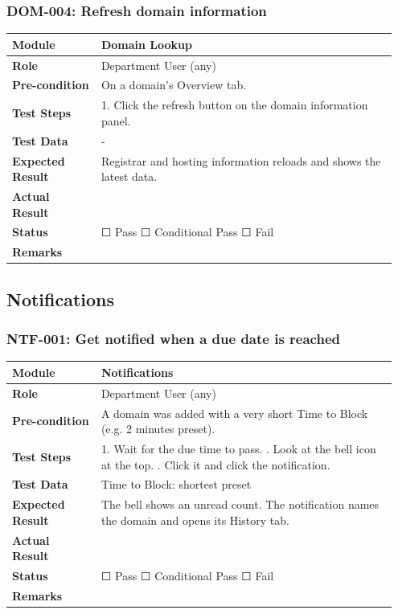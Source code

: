 \documentclass[10pt]{article}
\begin{document}
\subsubsection*{DOM-004: Refresh domain information}
\begin{longtable}{p{0.22\linewidth}p{0.73\linewidth}}
\hline
\textbf{Module} & Domain Lookup \\ \hline
\textbf{Role} & Department User (any) \\ \hline
\textbf{Pre-condition} & On a domain's Overview tab. \\ \hline
\textbf{Test Steps} & 1. Click the refresh button on the domain information panel. \\ \hline
\textbf{Test Data} & - \\ \hline
\textbf{Expected Result} & Registrar and hosting information reloads and shows the latest data. \\ \hline
\textbf{Actual Result} & \newline \newline \\ \hline
\textbf{Status} & ☐ Pass \quad ☐ Conditional Pass \quad ☐ Fail \\ \hline
\textbf{Remarks} & \newline \\ \hline
\end{longtable}
\subsection{Notifications}
\subsubsection*{NTF-001: Get notified when a due date is reached}
\begin{longtable}{p{0.22\linewidth}p{0.73\linewidth}}
\hline
\textbf{Module} & Notifications \\ \hline
\textbf{Role} & Department User (any) \\ \hline
\textbf{Pre-condition} & A domain was added with a very short Time to Block (e.g. 2 minutes preset). \\ \hline
\textbf{Test Steps} & 1. Wait for the due time to pass. \newline 2. Look at the bell icon at the top. \newline 3. Click it and click the notification. \\ \hline
\textbf{Test Data} & Time to Block: shortest preset \\ \hline
\textbf{Expected Result} & The bell shows an unread count. The notification names the domain and opens its History tab. \\ \hline
\textbf{Actual Result} & \newline \newline \\ \hline
\textbf{Status} & ☐ Pass \quad ☐ Conditional Pass \quad ☐ Fail \\ \hline
\textbf{Remarks} & \newline \\ \hline
\end{longtable}
\end{document}

